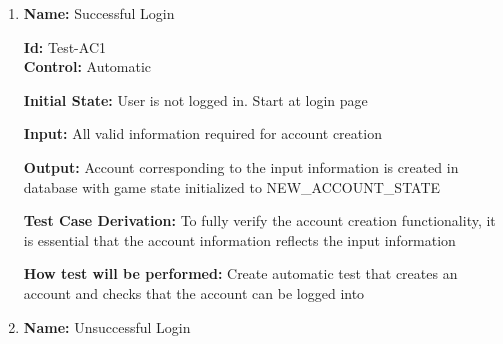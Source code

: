 \documentclass[12pt, titlepage]{article}
\begin{document}

\begin{enumerate}


					
					
					

					


\item{\textbf{Name:} Successful Login } %

\textbf{Id:} Test-AC1 \label{Test-AC1} \\

\textbf{Control:} Automatic
					
\textbf{Initial State:} User is not logged in. Start at login page
					
\textbf{Input:} All valid information required for account creation
					
\textbf{Output:} Account corresponding to the input information is created in database with game state initialized to NEW\_ACCOUNT\_STATE

\textbf{Test Case Derivation:} To fully verify the account creation functionality, it is essential that the account information reflects the input information

\textbf{How test will be performed:} Create automatic test that creates an account and checks that the account can be logged into

\item{\textbf{Name:} Unsuccessful Login }%


\end{enumerate}
\end{document}
